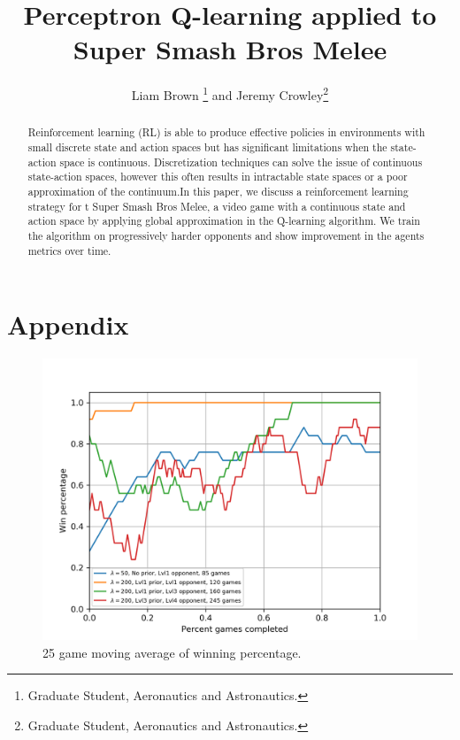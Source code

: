 \documentclass[journal]{new-aiaa}
\title{Perceptron Q-learning applied to Super Smash Bros Melee}
\author{Liam Brown \footnote{Graduate Student, Aeronautics and Astronautics.} and Jeremy Crowley\footnote{Graduate Student, Aeronautics and Astronautics.}}
\affil{Stanford University, Stanford, CA, 94305}
\begin{document}
\maketitle

\begin{abstract}
Reinforcement learning (RL) is able to produce effective policies in environments with small discrete state and action spaces but has significant limitations when the state-action space is continuous. Discretization techniques can solve the issue of continuous state-action spaces, however this often results in intractable state spaces or a poor approximation of the continuum.In this paper, we discuss a reinforcement learning strategy for t Super Smash Bros Melee, a video game with a continuous state and action space by applying global approximation in the Q-learning algorithm. We train the algorithm on progressively harder opponents and show improvement in the agents metrics over time.

\end{abstract}


%
%



%
%



%
%



%
%



%
%



%
%



%
%
\newpage
\section*{Appendix}

\begin{figure}[!htb]
\centering
	\includegraphics[width=120mm]{winpctg.png}
	\caption{25 game moving average of winning percentage. \label{winpctg}}
\end{figure}
\end{document}
